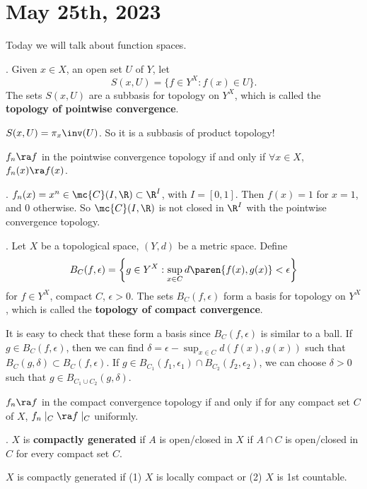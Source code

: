 \section*{May 25th, 2023}

Today we will talk about function spaces.


.  Given \(x \in X\), an open set \(U\) of \(Y\), let
\[
    S(x, U) = \{f \in Y^X : f(x) \in U\}.
\]
The sets \(S(x, U)\) are a subbasis for topology on \(Y^X\), which is called the \textbf{topology of pointwise convergence}.

\rmk \(S(x, U) = \pi_x\inv(U)\). So it is a subbasis of product topology!

 \(f_n \ra f\) in the pointwise convergence topology if and only if \(\forall x \in X\), \(f_n(x) \ra f(x)\).

\ex. \(f_n(x) = x^n \in \mc{C}(I, \R) \subset \R^I\), with \(I = [0, 1]\). Then \(f(x) = 1\) for \(x = 1\), and \(0\) otherwise. So \(\mc{C}(I, \R)\) is not closed in \(\R^I\) with the pointwise convergence topology.

.  Let \(X\) be a topological space, \((Y, d)\) be a metric space. Define
\[
    B_C(f, \epsilon) = \left\{g \in Y^X : \sup_{x \in C} d\paren{f(x), g(x)} < \epsilon\right\}
\]
for \(f \in Y^X\), compact \(C\), \(\epsilon > 0\). The sets \(B_C(f, \epsilon)\) form a basis for topology on \(Y^X\), which is called the \textbf{topology of compact convergence}.

\rmk It is easy to check that these form a basis since \(B_C(f, \epsilon)\) is similar to a ball. If \(g \in B_C(f, \epsilon)\), then we can find \(\delta = \epsilon - \sup_{x \in C} d(f(x), g(x))\) such that \(B_C(g, \delta) \subset B_C(f, \epsilon)\). If \(g \in B_{C_1}(f_1, \epsilon_1) \cap B_{C_2}(f_2, \epsilon_2)\), we can choose \(\delta > 0\) such that \(g \in B_{C_1 \cup C_2}(g, \delta)\).

 \(f_n \ra f\) in the compact convergence topology if and only if for any compact set \(C\) of \(X\), \(f_n \mid_C \ra f \mid_C\) uniformly.

.  \(X\) is \textbf{compactly generated} if \(A\) is open/closed in \(X\) if \(A\cap C\) is open/closed in \(C\) for every compact set \(C\).

 \(X\) is compactly generated if (1) \(X\) is locally compact or (2) \(X\) is 1st countable.

